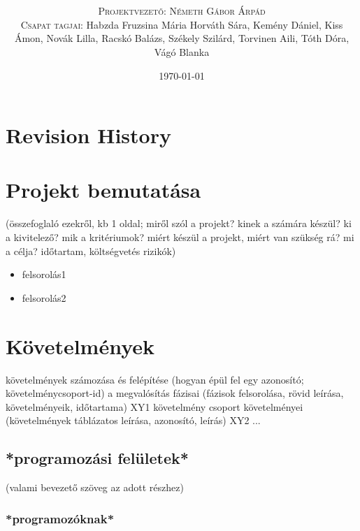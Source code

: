 \documentclass{article}
\title{\textbf{\BoldTitle}\\\Subtitle}
\author{\textsc{\Large Projektvezető: Németh Gábor Árpád} \\ \textsc{Csapat tagjai:} Habzda Fruzsina Mária Horváth Sára, Kemény Dániel, Kiss Ámon, Novák Lilla, Racskó Balázs, Székely Szilárd, Torvinen Aili, Tóth Dóra, Vágó Blanka}
\date{\today}
\begin{document}
\maketitle

\pagebreak
\tableofcontents %

\pagebreak
\section{Revision History}

\begin{versionhistory}
\end{versionhistory}


\pagebreak
\section{Projekt bemutatása}

(összefoglaló ezekről, kb 1 oldal;
miről szól a projekt?
kinek a számára készül?
ki a kivitelező?
mik a kritériumok?
miért készül a projekt, miért van szükség rá?
mi a célja?
időtartam, költségvetés
rizikók)


\begin{itemize}
\item felsorolás1
\item felsorolás2
\end{itemize}


\pagebreak
\section{Követelmények}

követelmények számozása és felépítése (hogyan épül fel egy azonosító; követelménycsoport-id)
a megvalósítás fázisai (fázisok felsorolása, rövid leírása, követelményeik, időtartama) 
XY1 követelmény csoport követelményei (követelmények táblázatos leírása, azonosító, leírás)
XY2 ...

\subsection{*programozási felületek*}

(valami bevezető szöveg az adott részhez)

\subsubsection{*programozóknak*}
\end{document}
